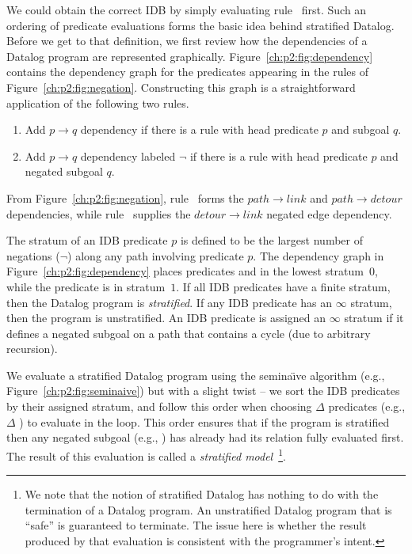 We could obtain the correct IDB by simply evaluating rule~ first.  Such
an ordering of predicate evaluations forms the basic idea behind stratified
Datalog.  Before we get to that definition, we first review how the
dependencies of a Datalog program are represented graphically.
Figure~\ref{ch:p2:fig:dependency} contains the dependency graph for the
predicates appearing in the rules of Figure~\ref{ch:p2:fig:negation}.
Constructing this graph is a straightforward application of the following two
rules.
\begin{enumerate}
  \ssp
  \item Add $p \rightarrow q$ dependency if there is a rule with head predicate $p$ and subgoal $q$.
  \item Add $p \rightarrow q$ dependency labeled $\neg$ if there is a rule with head predicate $p$ and negated subgoal $q$.
\end{enumerate}
From Figure~\ref{ch:p2:fig:negation}, rule~ forms the $path \rightarrow
link$ and $path \rightarrow detour$ dependencies, while rule~ supplies the
$detour \rightarrow link$ negated edge dependency. 

The stratum of an IDB predicate $p$ is defined to be the largest number of
negations ($\neg$) along any path involving predicate $p$.  The dependency graph
in Figure~\ref{ch:p2:fig:dependency} places predicates  and
 in the lowest stratum~$0$, while the  predicate is in
stratum~$1$.  If all IDB predicates have a finite stratum, then the Datalog
program is {\em stratified}.  If any IDB predicate has an $\infty$ stratum,
then the program is unstratified.  An IDB predicate is assigned an $\infty$
stratum if it defines a negated subgoal on a path that contains a cycle (due
to arbitrary recursion).

We evaluate a stratified Datalog program using the semina\"{\i}ve algorithm
(e.g., Figure~\ref{ch:p2:fig:seminaive}) but with a slight twist -- we sort the
IDB predicates by their assigned stratum, and follow this order when choosing
$\Delta$ predicates (e.g., $\Delta$ ) to evaluate in the loop.  This
order ensures that if the program is stratified then any negated subgoal (e.g.,
) has already had its relation fully evaluated first.  The result of
this evaluation is called a {\em stratified model}~\footnote{We note that the
notion of stratified Datalog has nothing to do with the termination of a
Datalog program.  An unstratified Datalog program that is ``safe'' is
guaranteed to terminate.  The issue here is whether the result produced by that
evaluation is consistent with the programmer's intent.}.

